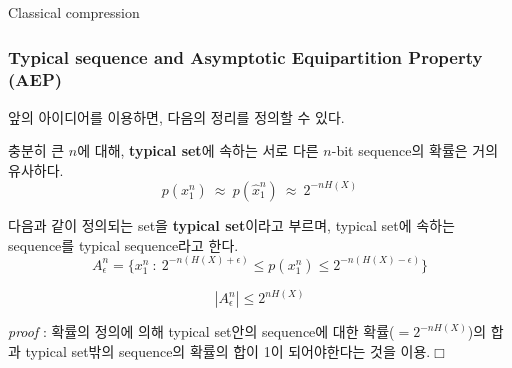 \documentclass[9pt]{beamer}
\begin{document}
\begin{section}{Classical compression}
        \begin{frame}
            \frametitle{Typical sequence and Asymptotic Equipartition Property (AEP)}
            앞의 아이디어를 이용하면, 다음의 정리를 정의할 수 있다.
            \begin{theorem}
                충분히 큰 $n$에 대해, \textbf{typical set}에 속하는 서로 다른 $n$-bit sequence의 확률은 거의 유사하다.
                \begin{equation*}
                    p(x_1^n) \ \approx \ p(\hat x_1^n) \ \approx \ 2^{-n H(X)}
                \end{equation*}
            \end{theorem}
            \begin{definition}
                다음과 같이 정의되는 set을 \textbf{typical set}이라고 부르며, typical set에 속하는 sequence를 typical sequence라고 한다. 
                \begin{equation*}
                    A_{\epsilon}^n = \Big\{x_1^n \ : \  2^{-n(H(X) + \epsilon)} \le p(x_1^n) \le 2^{-n (H(X) - \epsilon)}\Big\}
                \end{equation*}
            \end{definition}
            \begin{theorem}
                \vspace{-0.2cm}
                \begin{equation*}
                    |A_\epsilon^n| \le 2^{nH(X)}
                \end{equation*}
            \end{theorem}
            \textit{proof} : 확률의 정의에 의해 typical set안의 sequence에 대한 확률($=2^{-nH(X)}$)의 합과 typical set밖의 sequence의 확률의 합이 1이 되어야한다는 것을 이용.$\Box$
        \end{frame}


\end{section}
\end{document}
